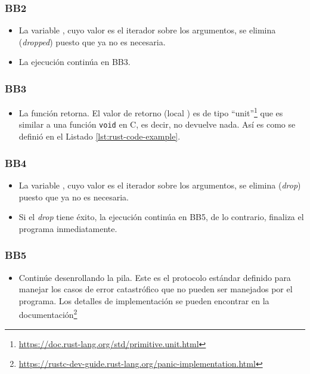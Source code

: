 \subsubsection{BB2}

\begin{itemize}
    \item La variable , cuyo valor es el iterador sobre los argumentos,
          se elimina (\emph{dropped}) puesto que ya no es necesaria.
    \item La ejecución continúa en BB3.
\end{itemize}

\subsubsection{BB3}

\begin{itemize}
    \item La función retorna.
          El valor de retorno (local ) es de tipo ``unit''\footnote{\url{https://doc.rust-lang.org/std/primitive.unit.html}}
          que es similar a una función \texttt{void} en C, es decir, no devuelve nada.
          Así es como se definió  en el Listado \ref{lst:rust-code-example}.
\end{itemize}

\subsubsection{BB4}

\begin{itemize}
    \item La variable , cuyo valor es el iterador sobre los argumentos,
          se elimina (\emph{drop}) puesto que ya no es necesaria.
    \item Si el \textit{drop} tiene éxito, la ejecución continúa en BB5,
          de lo contrario, finaliza el programa inmediatamente.
\end{itemize}

\subsubsection{BB5}

\begin{itemize}
    \item Continúe desenrollando la pila. Este es el protocolo estándar definido para manejar los
          casos de error catastrófico que no pueden ser manejados por el programa. Los detalles
          de implementación se pueden encontrar en la documentación\footnote{\url{https://rustc-dev-guide.rust-lang.org/panic-implementation.html}}
\end{itemize}